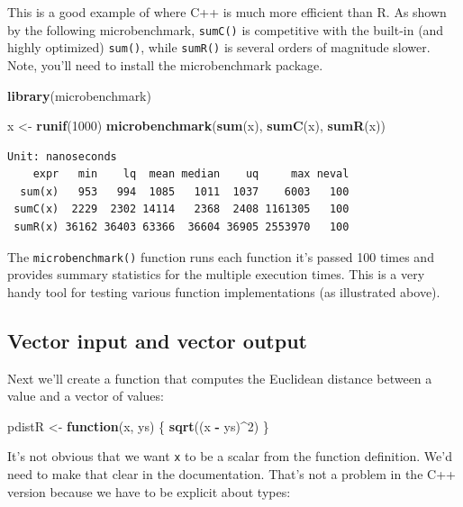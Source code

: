 \documentclass[]{krantz}
\makeatletter
\newenvironment{Shaded}{\begin{snugshade}}{\end{snugshade}}
\newcommand{\KeywordTok}[1]{\textcolor[rgb]{0.27,0.27,0.27}{\textbf{#1}}}
\newcommand{\DecValTok}[1]{\textcolor[rgb]{0.06,0.06,0.06}{#1}}
\newcommand{\StringTok}[1]{\textcolor[rgb]{0.5,0.5,0.5}{#1}}
\newcommand{\ControlFlowTok}[1]{\textcolor[rgb]{0.27,0.27,0.27}{\textbf{#1}}}
\newcommand{\OperatorTok}[1]{\textcolor[rgb]{0.43,0.43,0.43}{\textbf{#1}}}
\newcommand{\NormalTok}[1]{#1}
\newenvironment{kframe}{%
\medskip{}
\setlength{\fboxsep}{.8em}
 \def\at@end@of@kframe{}%
 \ifinner\ifhmode%
  \def\at@end@of@kframe{\end{minipage}}%
  \begin{minipage}{\columnwidth}%
 \fi\fi%
 \def\FrameCommand##1{\hskip\@totalleftmargin \hskip-\fboxsep
 \colorbox{shadecolor}{##1}\hskip-\fboxsep
     \hskip-\linewidth \hskip-\@totalleftmargin \hskip\columnwidth}%
 \MakeFramed {\advance\hsize-\width
   \@totalleftmargin\z@ \linewidth\hsize
   \@setminipage}}%
 {\par\unskip\endMakeFramed%
 \at@end@of@kframe}
\renewenvironment{Shaded}{\begin{kframe}}{\end{kframe}}
\makeatother
\begin{document}
This is a good example of where C++ is much more efficient than R. As
shown by the following microbenchmark, \texttt{sumC()} is competitive
with the built-in (and highly optimized) \texttt{sum()}, while
\texttt{sumR()} is several orders of magnitude slower. Note, you'll need
to install the microbenchmark package.

\begin{Shaded}
\begin{Highlighting}[]
\KeywordTok{library}\NormalTok{(microbenchmark)}

\NormalTok{x <-}\StringTok{ }\KeywordTok{runif}\NormalTok{(}\DecValTok{1000}\NormalTok{)}
\KeywordTok{microbenchmark}\NormalTok{(}\KeywordTok{sum}\NormalTok{(x), }\KeywordTok{sumC}\NormalTok{(x), }\KeywordTok{sumR}\NormalTok{(x))}
\end{Highlighting}
\end{Shaded}

\begin{verbatim}
Unit: nanoseconds
    expr   min    lq  mean median    uq     max neval
  sum(x)   953   994  1085   1011  1037    6003   100
 sumC(x)  2229  2302 14114   2368  2408 1161305   100
 sumR(x) 36162 36403 63366  36604 36905 2553970   100
\end{verbatim}

The \texttt{microbenchmark()} function runs each function it's passed
100 times and provides summary statistics for the multiple execution
times. This is a very handy tool for testing various function
implementations (as illustrated above).

\subsection{Vector input and vector
output}\label{vector-input-and-vector-output}

Next we'll create a function that computes the Euclidean distance
between a value and a vector of values:

\begin{Shaded}
\begin{Highlighting}[]
\NormalTok{pdistR <-}\StringTok{ }\ControlFlowTok{function}\NormalTok{(x, ys) \{}
    \KeywordTok{sqrt}\NormalTok{((x }\OperatorTok{-}\StringTok{ }\NormalTok{ys)}\OperatorTok{^}\DecValTok{2}\NormalTok{)}
\NormalTok{\}}
\end{Highlighting}
\end{Shaded}

It's not obvious that we want \texttt{x} to be a scalar from the
function definition. We'd need to make that clear in the documentation.
That's not a problem in the C++ version because we have to be explicit
about types:
\end{document}

